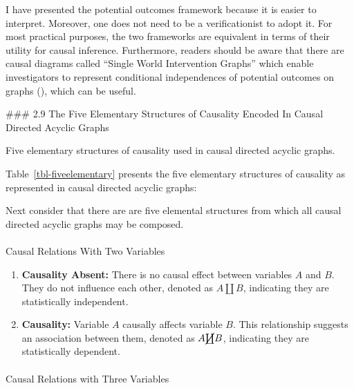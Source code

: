 \documentclass[
  single column]{article}
\makeatletter
\let\oldparagraph\paragraph
\renewcommand{\paragraph}{
    \@ifstar
      \xxxParagraphStar
      \xxxParagraphNoStar
  }
\newcommand{\xxxParagraphStar}[1]{\oldparagraph*{#1}\mbox{}}
\newcommand{\xxxParagraphNoStar}[1]{\oldparagraph{#1}\mbox{}}
\providecommand{\tightlist}{%
  \setlength{\itemsep}{0pt}\setlength{\parskip}{0pt}}\usepackage{longtable,booktabs,array}
\makeatother
\begin{document}
I have presented the potential outcomes framework because it is easier
to interpret. Moreover, one does not need to be a verificationist to
adopt it. For most practical purposes, the two frameworks are equivalent
in terms of their utility for causal inference. Furthermore, readers
should be aware that there are causal diagrams called ``Single World
Intervention Graphs'' which enable investigators to represent
conditional independences of potential outcomes on graphs
(),
which can be useful.

\#\#\# 2.9 The Five Elementary Structures of Causality Encoded In Causal
Directed Acyclic Graphs

\begin{table}

\caption{\label{tbl-fiveelementary}Five elementary structures of
causality used in causal directed acyclic graphs.}

\centering{

\terminologydirectedgraph

}

\end{table}%

Table~\ref{tbl-fiveelementary} presents the five elementary structures
of causality as represented in causal directed acyclic graphs:

Next consider that there are are five elemental structures from which
all causal directed acyclic graphs may be composed.

\paragraph{Causal Relations With Two
Variables}\label{causal-relations-with-two-variables}

\begin{enumerate}
\def\labelenumi{\arabic{enumi}.}
\tightlist
\item
  \textbf{Causality Absent:} There is no causal effect between variables
  \(A\) and \(B\). They do not influence each other, denoted as
  \(A \coprod B\), indicating they are statistically independent.
\item
  \textbf{Causality:} Variable \(A\) causally affects variable \(B\).
  This relationship suggests an association between them, denoted as
  \(A \cancel{\coprod} B\), indicating they are statistically dependent.
\end{enumerate}

\paragraph{Causal Relations with Three
Variables}\label{causal-relations-with-three-variables}
\end{document}
